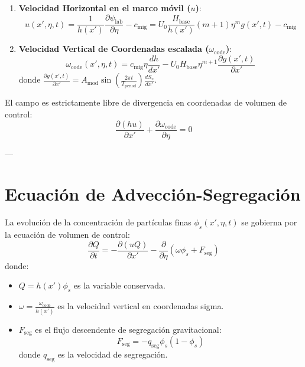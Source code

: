 \documentclass[11pt,a4paper]{article}
\begin{document}
\begin{enumerate}
    \item \textbf{Velocidad Horizontal en el marco móvil (\(u\))}:
    \begin{equation}
    u(x', \eta, t) = \frac{1}{h(x')} \frac{\partial \psi_{\text{lab}}}{\partial \eta} - c_{\text{mig}} = U_0 \frac{H_{\text{base}}}{h(x')} (m+1) \eta^m g(x', t) - c_{\text{mig}}
    \end{equation}
    
    \item \textbf{Velocidad Vertical de Coordenadas escalada (\(\omega_{\text{code}}\))}:
    \begin{equation}
    \omega_{\text{code}}(x', \eta, t) = c_{\text{mig}} \eta \frac{dh}{dx'} - U_0 H_{\text{base}} \eta^{m+1} \frac{\partial g(x', t)}{\partial x'}
    \end{equation}
    donde $\frac{\partial g(x', t)}{\partial x'} = A_{\text{mod}} \sin\left(\frac{2\pi t}{T_{\text{period}}}\right) \frac{dS_x}{dx'}$.
\end{enumerate}

El campo es estrictamente libre de divergencia en coordenadas de volumen de control:
\begin{equation}
\frac{\partial(h u)}{\partial x'} + \frac{\partial \omega_{\text{code}}}{\partial \eta} = 0
\end{equation}

---

\section{Ecuación de Advección-Segregación}
La evolución de la concentración de partículas finas $\phi_s(x', \eta, t)$ se gobierna por la ecuación de volumen de control:
\begin{equation}
\frac{\partial Q}{\partial t} = -\frac{\partial (u Q)}{\partial x'} - \frac{\partial}{\partial \eta} \left( \omega \phi_s + F_{\text{seg}} \right)
\end{equation}
donde:
\begin{itemize}
    \item $Q = h(x') \phi_s$ es la variable conservada.
    \item $\omega = \frac{\omega_{\text{code}}}{h(x')}$ es la velocidad vertical en coordenadas sigma.
    \item $F_{\text{seg}}$ es el flujo descendente de segregación gravitacional:
    \begin{equation}
    F_{\text{seg}} = -q_{\text{seg}} \phi_s (1 - \phi_s)
    \end{equation}
    donde $q_{\text{seg}}$ es la velocidad de segregación.
\end{itemize}
\end{document}
